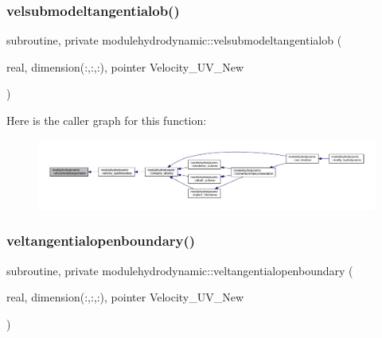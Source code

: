 \subsubsection{\texorpdfstring{velsubmodeltangentialob()}{velsubmodeltangentialob()}}
{\footnotesize\ttfamily subroutine, private modulehydrodynamic\+::velsubmodeltangentialob (\begin{DoxyParamCaption}\item[{real, dimension(\+:,\+:,\+:), pointer}]{Velocity\+\_\+\+U\+V\+\_\+\+New }\end{DoxyParamCaption})\hspace{0.3cm}{\ttfamily [private]}}

Here is the caller graph for this function\+:\nopagebreak
\begin{figure}[H]
\begin{center}
\leavevmode
\includegraphics[width=350pt]{namespacemodulehydrodynamic_ac476fd6c2f59116c8cbcbed954fdbc5f_icgraph}
\end{center}
\end{figure}
\mbox{\label{namespacemodulehydrodynamic_a0be051dfb2855eb7014145fceaa64075}} 
\subsubsection{\texorpdfstring{veltangentialopenboundary()}{veltangentialopenboundary()}}
{\footnotesize\ttfamily subroutine, private modulehydrodynamic\+::veltangentialopenboundary (\begin{DoxyParamCaption}\item[{real, dimension(\+:,\+:,\+:), pointer}]{Velocity\+\_\+\+U\+V\+\_\+\+New }\end{DoxyParamCaption})\hspace{0.3cm}{\ttfamily [private]}}

